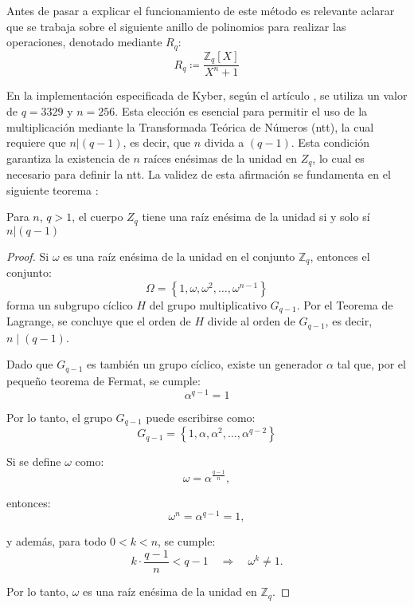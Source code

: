 Antes de pasar a explicar el funcionamiento de este método es relevante aclarar que se trabaja sobre el siguiente anillo de polinomios para realizar las operaciones, denotado mediante \(R_q\):
\begin{equation}
	R_q \coloneqq \dfrac{\mathbb{Z}_q[X]}{X^n + 1}
\end{equation}

En la implementación especificada de Kyber, según el artículo \cite{kyber-spec-2021}, se utiliza un valor de \(q=3329\) y \(n=256\). Esta elección es esencial para permitir el uso de la multiplicación mediante la Transformada Teórica de Números (\gls{ntt}), la cual requiere que \(n| (q-1)\), es decir, que \(n\) divida a \((q-1)\). Esta condición garantiza la existencia de \(n\) raíces enésimas de la unidad en \(Z_q\), lo cual es necesario para definir la \gls{ntt}. La validez de esta afirmación se fundamenta en el siguiente teorema \cite{moreno-roots}:
\newline

\begin{theorem}
	Para \(n\), \(q>1\), el cuerpo  \(Z_q\) tiene una raíz enésima de la unidad si y solo sí \(n| (q-1)\)
\end{theorem} 
\begin{proof}
	Si \(\omega\) es una raíz enésima de la unidad en el conjunto \( \mathbb{Z}_q \), entonces el conjunto:
	\begin{equation}
		\Omega = \left\{1, \omega, \omega^2, \dots, \omega^{n-1} \right\}
	\end{equation}
	forma un subgrupo cíclico \( H \) del grupo multiplicativo \( G_{q-1} \). Por el Teorema de Lagrange, se concluye que el orden de \( H \) divide al orden de \( G_{q-1} \), es decir, \( n \mid (q-1) \).
	\newline
	
	Dado que \( G_{q-1} \) es también un grupo cíclico, existe un generador \(\alpha\) tal que, por el pequeño teorema de Fermat, se cumple:
	\begin{equation}
		\alpha^{q-1} = 1
	\end{equation}
	
	Por lo tanto, el grupo \( G_{q-1} \) puede escribirse como:
	\begin{equation}
		G_{q-1} = \left\{1, \alpha, \alpha^2, \dots, \alpha^{q-2} \right\}
	\end{equation}
	
	Si se define \(\omega\) como:
	\begin{equation}
		\omega = \alpha^{\frac{q-1}{n}},
	\end{equation}
	
	entonces:
	\begin{equation}
		\omega^n = \alpha^{q-1} = 1,
	\end{equation}
	
	y además, para todo \( 0 < k < n \), se cumple:
	\begin{equation}
		k \cdot \frac{q-1}{n} < q-1 \quad \Rightarrow \quad \omega^k \neq 1.
	\end{equation}
	
	Por lo tanto, \(\omega\) es una raíz enésima de la unidad en \(\mathbb{Z}_q\).
\end{proof}
\newpage

